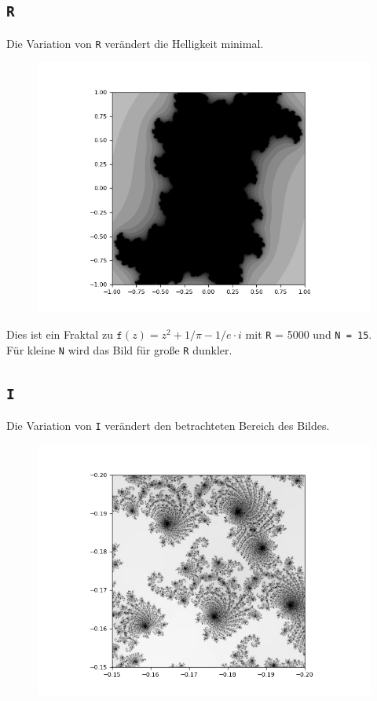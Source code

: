 \documentclass[12pt]{scrartcl}
\begin{document}
\subsection{\texttt{R}}
Die Variation von \texttt{R} verändert die Helligkeit minimal.\\

\begin{figure}[H]
\centering
\includegraphics[scale=0.5]{Fancy1.png}
\caption{}
\label{Fancy1}
\end{figure}

Dies ist ein Fraktal zu $\texttt{f}(z) = z^2 + 1/\pi - 1/e \cdot i$ mit \texttt{R} = 5000 und \texttt{N = 15}.\\
Für kleine \texttt{N} wird das Bild für große \texttt{R} dunkler.

\subsection{\texttt{I}}
Die Variation von \texttt{I} verändert den betrachteten Bereich des Bildes.\\

\begin{figure}[H]
\centering
\includegraphics[scale=0.5]{Illusion1.png}
\caption{}
\label{Illusion1}
\end{figure}
\end{document}
